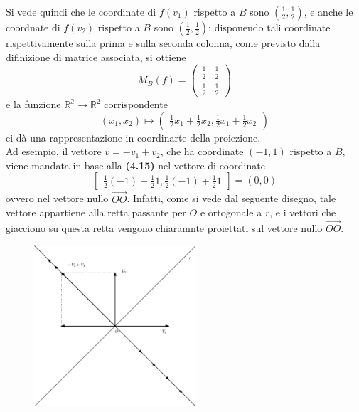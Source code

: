 \begin{esempio}
\begin{enumerate}
\begin{figure}[th]
    \end{figure}
    Si vede quindi che le coordinate di $f(v_1)$ rispetto a $B$ sono $\left(\frac{1}{2},\frac{1}{2}\right)$, e
    anche le coordnate di $f(v_2)$ rispetto a $B$ sono $\left(\frac{1}{2},\frac{1}{2}\right)$: disponendo tali
    coordinate rispettivamente sulla prima e sulla seconda colonna, come previsto dalla difinizione di matrice
    associata, si ottiene
    \begin{equation*}
      M_B(f)=
      \begin{pmatrix}
        \frac{1}{2}&\frac{1}{2}\\
        \frac{1}{2} & \frac{1}{2}
      \end{pmatrix}
    \end{equation*}
    e la funzione $\mathds{R^2}\to \mathds{R}^2$ corrispondente
    \begin{equation}
      (x_1,x_2)\mapsto
      \begin{pmatrix}
        \frac{1}{2}x_1+\frac{1}{2}x_2, \frac{1}{2}x_1+\frac{1}{2}x_2
      \end{pmatrix}
    \end{equation}
    ci dà una rappresentazione in coordinarte della proiezione.\\
    Ad esempio, il vettore $v=-v_1+v_2$, che ha coordinate $(-1,1)$ rispetto a $B$, viene mandata in base alla
    \textbf{(4.15)} nel vettore di coordinate
    \begin{equation*}
      \begin{bmatrix}
        \frac{1}{2}(-1)+\frac{1}{2}1, \frac{1}{2}(-1)+\frac{1}{2}1
      \end{bmatrix}=(0,0)
    \end{equation*}
    ovvero nel vettore nullo $\vec{OO}$. Infatti, come si vede dal seguente disegno, tale vettore appartiene
    alla retta passante per $O$ e ortogonale a $r$, e i vettori che giacciono su questa retta vengono chiaramnte
    proiettati sul vettore nullo $\vec{OO}$.
    \begin{figure}[th]
      \centering
        \includegraphics[width=6cm]{img/finiti/imgex4-3-7.eps}

\end{figure}
\end{enumerate}
\end{esempio}
